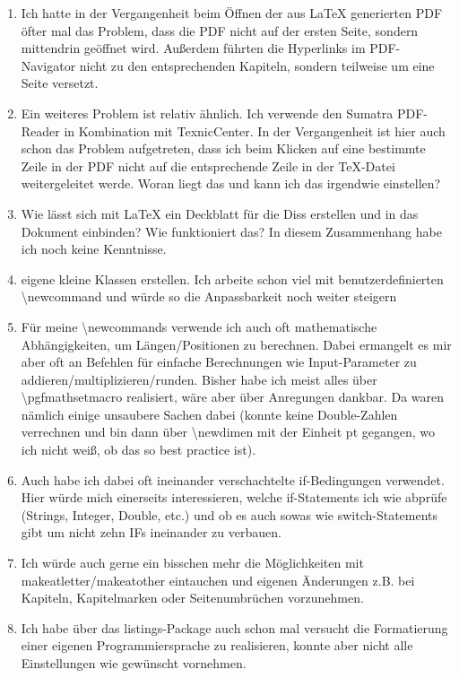 \documentclass[ngerman]{beamer}
\renewcommand{\aa}{\textasteriskcentered}
\newcommand{\bb}{\textasteriskcentered\textasteriskcentered}
\newcommand{\cc}{\textasteriskcentered\textasteriskcentered\textasteriskcentered}
\begin{document}
\begin{frame}[allowframebreaks]
\begin{enumerate}
\item 
Ich hatte in der Vergangenheit beim Öffnen der aus LaTeX generierten PDF öfter mal das Problem, dass die PDF nicht auf der ersten Seite, sondern mittendrin geöffnet wird. Außerdem führten die Hyperlinks im PDF-Navigator nicht zu den entsprechenden Kapiteln, sondern teilweise um eine Seite versetzt. \aa
 
\item 
Ein weiteres Problem ist relativ ähnlich. Ich verwende den Sumatra PDF-Reader in Kombination mit TexnicCenter. In der Vergangenheit ist hier auch schon das Problem aufgetreten, dass ich beim Klicken auf eine bestimmte Zeile in der PDF nicht auf die entsprechende Zeile in der TeX-Datei weitergeleitet werde. Woran liegt das und kann ich das irgendwie einstellen? \aa
 
\item 
Wie lässt sich mit LaTeX ein Deckblatt für die Diss erstellen und in das Dokument einbinden? Wie funktioniert das? In diesem Zusammenhang habe ich noch keine Kenntnisse. \aa
\item eigene kleine Klassen erstellen. Ich arbeite schon viel mit benutzerdefinierten \textbackslash newcommand und würde so die Anpassbarkeit noch weiter steigern \bb
\item Für meine \textbackslash newcommands verwende ich auch oft mathematische Abhängigkeiten, um Längen/Positionen zu berechnen. Dabei ermangelt es mir aber oft an Befehlen für einfache Berechnungen wie Input-Parameter zu addieren/multiplizieren/runden. Bisher habe ich meist alles über \textbackslash  pgfmathsetmacro realisiert, wäre aber über Anregungen dankbar. Da waren nämlich einige unsaubere Sachen dabei (konnte keine Double-Zahlen verrechnen und bin dann über \textbackslash  newdimen mit der Einheit pt gegangen, wo ich nicht weiß, ob das so best practice ist). \cc
\item 
Auch habe ich dabei oft ineinander verschachtelte if-Bedingungen verwendet. Hier würde mich einerseits interessieren, welche if-Statements ich wie abprüfe (Strings, Integer, Double, etc.) und ob es auch sowas wie switch-Statements gibt um nicht zehn IFs ineinander zu verbauen. \bb

\item Ich würde auch gerne ein bisschen mehr die Möglichkeiten mit makeatletter/makeatother eintauchen und eigenen Änderungen z.B. bei Kapiteln, Kapitelmarken oder Seitenumbrüchen vorzunehmen. \bb

\item Ich habe über das listings-Package auch schon mal versucht die Formatierung einer eigenen Programmiersprache zu realisieren, konnte aber nicht alle Einstellungen wie gewünscht vornehmen. \bb


\end{enumerate}
\end{frame}
\end{document}
